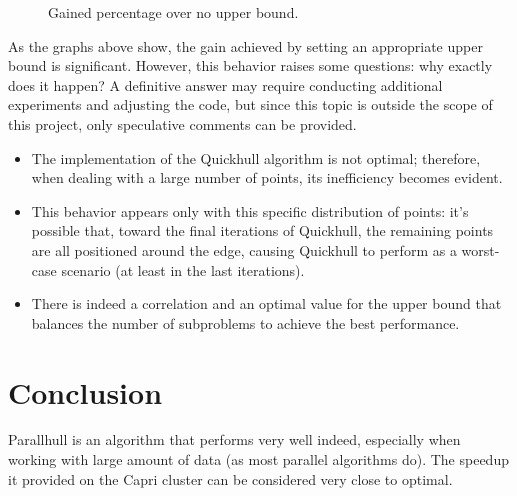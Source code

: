 \documentclass[a4paper]{article}
\begin{document}
\begin{figure}[H]
    \centering
    \caption{Gained percentage over no upper bound.}
\end{figure}

As the graphs above show, the gain achieved by setting an appropriate upper bound is significant.
However, this behavior raises some questions: why exactly does it happen?
A definitive answer may require conducting additional experiments and adjusting the code, but since this topic is outside the scope of this project, only speculative comments can be provided.

\begin{itemize}
	\item The implementation of the Quickhull algorithm is not optimal; therefore, when dealing with a large number of points, its inefficiency becomes evident.
	\item This behavior appears only with this specific distribution of points: it's possible that, toward the final iterations of Quickhull, the remaining points are all positioned around the edge, causing Quickhull to perform as a worst-case scenario (at least in the last iterations).
	\item There is indeed a correlation and an optimal value for the upper bound that balances the number of subproblems to achieve the best performance.
\end{itemize}

\section{Conclusion}

Parallhull is an algorithm that performs very well indeed, especially when working with large amount of data (as most parallel algorithms do).
The speedup it provided on the Capri cluster can be considered very close to optimal.
\end{document}
